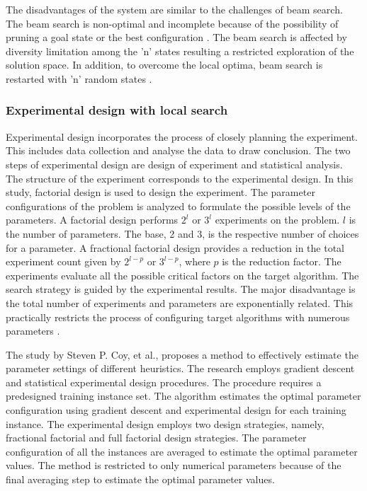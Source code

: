 The disadvantages of the system are similar to the challenges of beam search. The beam search is non-optimal and incomplete because of the possibility of pruning a goal state or the best configuration \cite{Beamsearch_disadv}. The beam search is affected by diversity limitation among the 'n' states resulting a restricted exploration of the solution space. In addition, to overcome the local optima, beam search is restarted with 'n' random states \cite{Russell_Norvig}.

\subsubsection{Experimental design with local search}

Experimental design incorporates the process of closely planning the experiment. This includes data collection and analyse the data to draw conclusion. The two steps of experimental design are design of experiment and statistical analysis. The structure of the experiment corresponds to the experimental design. In this study, factorial design is used to design the experiment. The parameter configurations of the problem is analyzed to formulate the possible levels of the parameters. A factorial design performs $2^l$ or $3^l$ experiments on the problem. $l$ is the number of parameters. The base, 2 and 3, is the respective number of choices for a parameter. A fractional factorial design provides a reduction in the total experiment count given by $2^{l-p}$ or $3^{l-p}$, where $p$ is the reduction factor. The experiments evaluate all the possible critical factors on the target algorithm. The search strategy is guided by the experimental results. The major disadvantage is the total number of experiments and parameters are exponentially related. This practically restricts the process of configuring target algorithms with numerous parameters \cite{Adenso-Diaz_2006}.

The study \cite{Coy_2001} by Steven P. Coy, et al.,  proposes a method to effectively estimate the parameter settings of different heuristics.  The research employs gradient descent and statistical experimental design procedures. The procedure requires a predesigned training instance set. The algorithm estimates the optimal parameter configuration using gradient descent and experimental design for each training instance. The experimental design employs two design strategies, namely, fractional factorial and full factorial design strategies. The parameter configuration of all the instances are averaged to estimate the optimal parameter values. The method is restricted to only numerical parameters because of the final averaging step to estimate the optimal parameter values.

